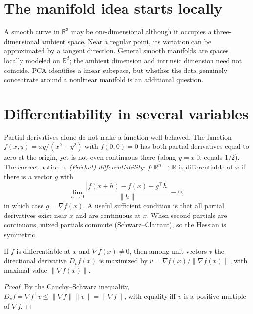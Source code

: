 \section{The manifold idea starts locally}
A smooth curve in $\mathbb R^3$ may be one-dimensional although it occupies a three-dimensional ambient space. Near a regular point, its variation can be approximated by a tangent direction. General smooth manifolds are spaces locally modeled on $\mathbb R^d$; the ambient dimension and intrinsic dimension need not coincide. PCA identifies a linear subspace, but whether the data genuinely concentrate around a nonlinear manifold is an additional question.

\section{Differentiability in several variables}
Partial derivatives alone do not make a function well behaved. The function $f(x,y)=xy/(x^2+y^2)$ with $f(0,0)=0$ has both partial derivatives equal to zero at the origin, yet is not even continuous there (along $y=x$ it equals $1/2$). The correct notion is \emph{(Fr\'echet) differentiability}: $f:\mathbb R^n\to\mathbb R$ is differentiable at $x$ if there is a vector $g$ with
\[
\lim_{h\to0}\frac{|f(x+h)-f(x)-g^\top h|}{\|h\|}=0,
\]
in which case $g=\nabla f(x)$. A useful sufficient condition is that all partial derivatives exist near $x$ and are continuous at $x$. When second partials are continuous, mixed partials commute (Schwarz--Clairaut), so the Hessian is symmetric.

\begin{proposition}
If $f$ is differentiable at $x$ and $\nabla f(x)\ne0$, then among unit vectors $v$ the directional derivative $D_vf(x)$ is maximized by $v=\nabla f(x)/\|\nabla f(x)\|$, with maximal value $\|\nabla f(x)\|$.
\end{proposition}
\begin{proof}
By the Cauchy--Schwarz inequality, $D_vf=\nabla f^\top v\le\|\nabla f\|\|v\|=\|\nabla f\|$, with equality iff $v$ is a positive multiple of $\nabla f$.
\end{proof}

